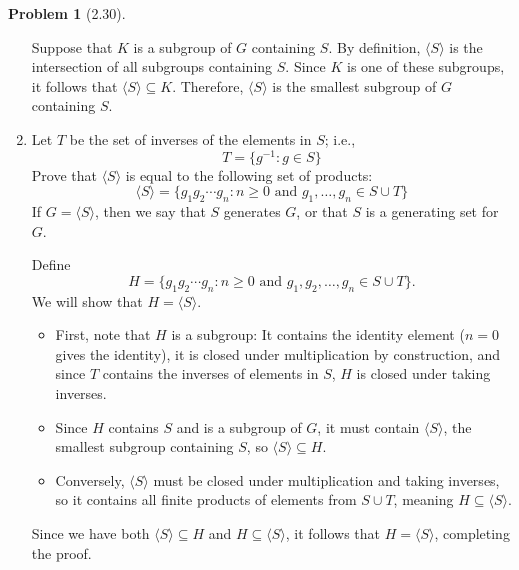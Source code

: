 \documentclass[12pt]{article}
\theoremstyle{definition}
\newtheorem{problem}{Problem}
\begin{document}
\begin{problem}[2.30]
\begin{enumerate}[label=(\alph*)]
            \begin{solution}
                Suppose that $K$ is a subgroup of $G$ containing $S$. By definition, $\langle S \rangle$ is the intersection of all subgroups containing $S$. Since $K$ is one of these subgroups, it follows that $\langle S \rangle \subseteq K$. Therefore, $\langle S \rangle$ is the smallest subgroup of $G$ containing $S$.

            \end{solution}
        \item Let $T$ be the set of inverses of the elements in $S$; i.e.,
              \[T = \{g^{-1}:g \in S\}\]
              Prove that $\langle S \rangle$ is equal to the following set of products:
              \[\langle S \rangle = \{g_1g_2 \cdots g_n : n \geq 0 \text{ and } g_1,\ldots,g_n \in S \cup T\}\]
              If $G = \langle S \rangle$, then we say that $S$ generates $G$, or that $S$ is a generating set for $G$.
            
            \begin{solution}
                Define 
                \[
                    H = \{ g_1 g_2 \cdots g_n : n \geq 0 \text{ and } g_1, g_2, \dots, g_n \in S \cup T \}.
                \]
                We will show that $H = \langle S \rangle$.
                \begin{itemize}
                    \item First, note that $H$ is a subgroup: It contains the identity element ($n=0$ gives the identity), it is closed under multiplication by construction, and since $T$ contains the inverses of elements in $S$, $H$ is closed under taking inverses.
                    \item Since $H$ contains $S$ and is a subgroup of $G$, it must contain $\langle S \rangle$, the smallest subgroup containing $S$, so $\langle S \rangle \subseteq H$.
                    \item Conversely, $\langle S \rangle$ must be closed under multiplication and taking inverses, so it contains all finite products of elements from $S \cup T$, meaning $H \subseteq \langle S \rangle$.
                \end{itemize}
                Since we have both $\langle S \rangle \subseteq H$ and $H \subseteq \langle S \rangle$, it follows that $H = \langle S \rangle$, completing the proof.
            
            \end{solution}
    \end{enumerate}
\end{problem}
\end{document}
